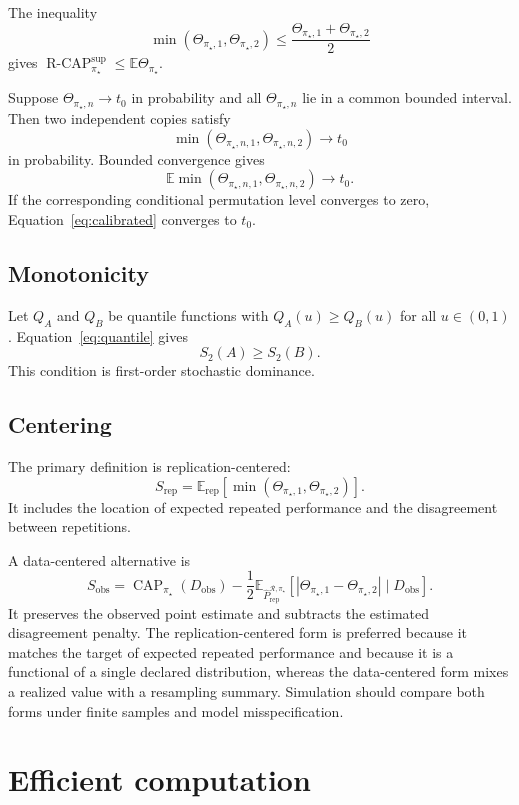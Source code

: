 \documentclass[11pt]{article}
\newcommand{\CAP}{\operatorname{CAP}}
\newcommand{\Regime}{\mathcal{R}}
\newcommand{\Tpi}{\CAP_{\pi_\star}}
\newcommand{\E}{\mathbb{E}}
\newcommand{\RCAP}{\operatorname{R\text{-}CAP}^{\mathrm{sup}}_{\pi_\star}}
\newcommand{\PRepHat}{\widehat{P}_{\mathrm{rep}}^{\Regime,\pi_\star}}
\theoremstyle{remark}
\begin{document}
The inequality
\[
\min(\Theta_{\pi_\star,1},\Theta_{\pi_\star,2})
\leq
\frac{\Theta_{\pi_\star,1}+\Theta_{\pi_\star,2}}{2}
\]
gives $\RCAP\leq\E\Theta_{\pi_\star}$.

Suppose $\Theta_{\pi_\star,n}\to t_0$ in probability and all $\Theta_{\pi_\star,n}$ lie in a common bounded interval. Then two independent copies satisfy
\[
\min(\Theta_{\pi_\star,n,1},\Theta_{\pi_\star,n,2})\to t_0
\]
in probability. Bounded convergence gives
\[
\E\min(\Theta_{\pi_\star,n,1},\Theta_{\pi_\star,n,2})\to t_0.
\]
If the corresponding conditional permutation level converges to zero, Equation~\eqref{eq:calibrated} converges to $t_0$.

\subsection{Monotonicity}

Let $Q_A$ and $Q_B$ be quantile functions with $Q_A(u)\geq Q_B(u)$ for all $u\in(0,1)$. Equation~\eqref{eq:quantile} gives
\[
S_2(A)\geq S_2(B).
\]
This condition is first-order stochastic dominance.

\subsection{Centering}
\label{app:centering}

The primary definition is replication-centered:
\[
S_{\mathrm{rep}}
=
\E_{\mathrm{rep}}
\left[
\min(\Theta_{\pi_\star,1},\Theta_{\pi_\star,2})
\right].
\]
It includes the location of expected repeated performance and the disagreement between repetitions.

A data-centered alternative is
\[
S_{\mathrm{obs}}
=
\Tpi(D_{\mathrm{obs}})
-
\frac12
\E_{\PRepHat}
\left[
|\Theta_{\pi_\star,1}-\Theta_{\pi_\star,2}|
\mid D_{\mathrm{obs}}
\right].
\]
It preserves the observed point estimate and subtracts the estimated disagreement penalty. The replication-centered form is preferred because it matches the target of expected repeated performance and because it is a functional of a single declared distribution, whereas the data-centered form mixes a realized value with a resampling summary. Simulation should compare both forms under finite samples and model misspecification.

\section{Efficient computation}
\label{app:computation}
\end{document}
